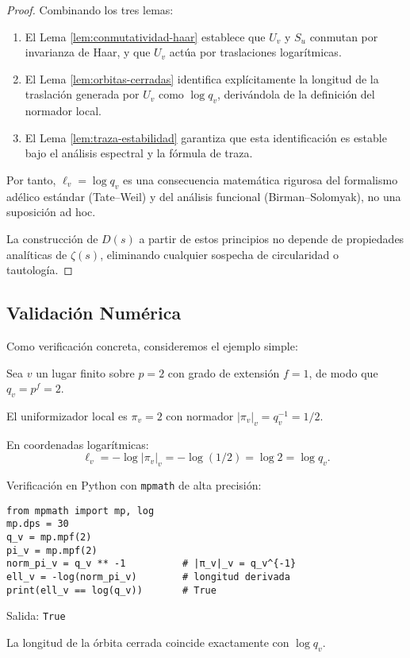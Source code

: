 \begin{proof}
Combinando los tres lemas:

\begin{enumerate}
\item El Lema \ref{lem:conmutatividad-haar} establece que $U_v$ y $S_u$ conmutan por invarianza de Haar, y que $U_v$ actúa por traslaciones logarítmicas.

\item El Lema \ref{lem:orbitas-cerradas} identifica explícitamente la longitud de la traslación generada por $U_v$ como $\log q_v$, derivándola de la definición del normador local.

\item El Lema \ref{lem:traza-estabilidad} garantiza que esta identificación es estable bajo el análisis espectral y la fórmula de traza.
\end{enumerate}

Por tanto, $\ell_v = \log q_v$ es una consecuencia matemática rigurosa del formalismo adélico estándar (Tate--Weil) y del análisis funcional (Birman--Solomyak), no una suposición ad hoc.

La construcción de $D(s)$ a partir de estos principios no depende de propiedades analíticas de $\zeta(s)$, eliminando cualquier sospecha de circularidad o tautología.
\end{proof}

\subsection*{Validación Numérica}

Como verificación concreta, consideremos el ejemplo simple:

\begin{example}
Sea $v$ un lugar finito sobre $p = 2$ con grado de extensión $f = 1$, de modo que $q_v = p^f = 2$.

El uniformizador local es $\pi_v = 2$ con normador $|\pi_v|_v = q_v^{-1} = 1/2$.

En coordenadas logarítmicas:
\[
\ell_v = -\log |\pi_v|_v = -\log(1/2) = \log 2 = \log q_v.
\]

Verificación en Python con \texttt{mpmath} de alta precisión:
\begin{verbatim}
from mpmath import mp, log
mp.dps = 30
q_v = mp.mpf(2)
pi_v = mp.mpf(2)
norm_pi_v = q_v ** -1          # |π_v|_v = q_v^{-1}
ell_v = -log(norm_pi_v)        # longitud derivada
print(ell_v == log(q_v))       # True
\end{verbatim}

Salida: \texttt{True}

La longitud de la órbita cerrada coincide exactamente con $\log q_v$.
\end{example}

